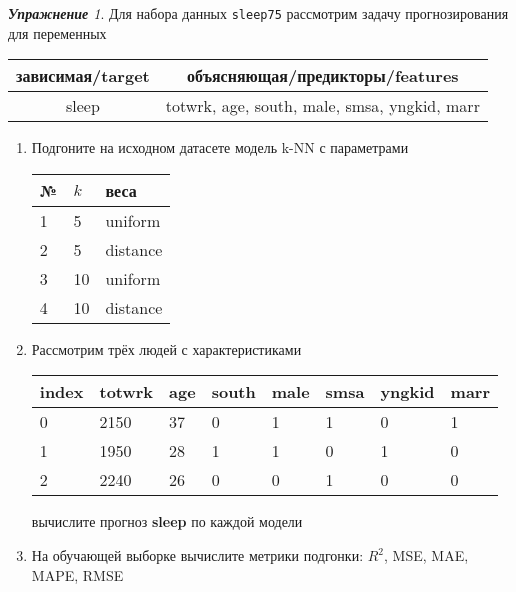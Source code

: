 \documentclass[a4,12pt]{article}
\theoremstyle{remark}
\newtheorem{exercise}{\textbf{Упражнение}}[section]
\begin{document}
\begin{exercise}
Для набора данных \texttt{sleep75} рассмотрим задачу прогнозирования
для переменных
\begin{center}
	\begin{tabular}{|c|c|}\hline
		зависимая/target & объясняющая/предикторы/features \\ \hline
		sleep & totwrk, age, south, male, smsa, yngkid, marr \\ \hline
	\end{tabular}
\end{center}
\begin{enumerate}
	\item Подгоните на исходном датасете модель k-NN с параметрами
	\begin{center}
		\begin{tabular}{|l|l|l|}\hline
		№ & \(k\) & веса \\ \hline
		1 & 5 & uniform \\
		2 & 5 & distance \\
		3 & 10 & uniform \\
		4 & 10 & distance \\ \hline
		\end{tabular}
	\end{center}
	\item Рассмотрим трёх людей с характеристиками
	\begin{center}
		\begin{tabular}{|l||l|l|l|l|l|l|l|}\hline
			index & totwrk & age & south & male & smsa & yngkid & marr \\ \hline\hline
			0 & 2150 & 37 & 0 & 1 & 1 & 0 & 1 \\
			1 & 1950 & 28 & 1 & 1 & 0 & 1 & 0 \\
			2 & 2240 & 26 & 0 & 0 & 1 & 0 & 0 \\ \hline
		\end{tabular}
	\end{center}
	вычислите прогноз \textbf{sleep} по каждой модели

	\item На обучающей выборке вычислите метрики подгонки: \(R^2\), 
	MSE, MAE, MAPE, RMSE
\end{enumerate}
\end{exercise}
\end{document}
